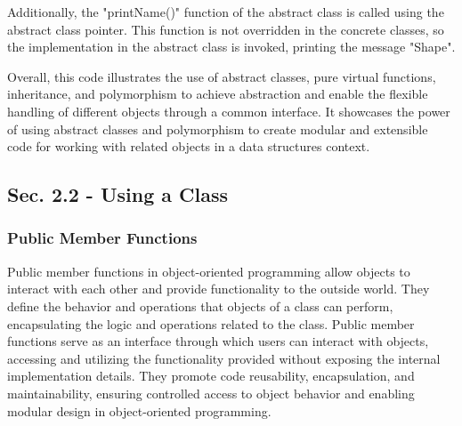 \begin{solution}
    \noindent Additionally, the "printName()" function of the abstract class is called using the abstract class pointer. This function is not overridden in the concrete classes, so the implementation in the abstract class is invoked, printing the message 
    "Shape".

    \noindent Overall, this code illustrates the use of abstract classes, pure virtual functions, inheritance, and polymorphism to achieve abstraction and enable the flexible handling of different objects through a common interface. It showcases the power 
    of using abstract classes and polymorphism to create modular and extensible code for working with related objects in a data structures context.
\end{solution}

\subsection*{Sec. 2.2 - Using a Class}
\subsubsection*{Public Member Functions}

Public member functions in object-oriented programming allow objects to interact with each other and provide functionality to the outside world. They define the behavior and operations that objects of a class can perform, encapsulating the logic and operations
related to the class. Public member functions serve as an interface through which users can interact with objects, accessing and utilizing the functionality provided without exposing the internal implementation details. They promote code reusability, encapsulation, 
and maintainability, ensuring controlled access to object behavior and enabling modular design in object-oriented programming.

